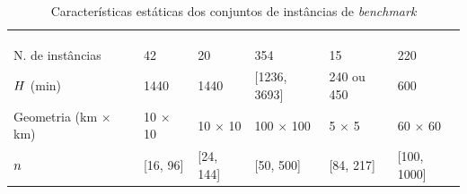 \begin{table}[]
\newcommand{\firstColumnWidth}{1.52cm}
\newcommand{\columnWidth}{2.25cm}
\newcommand{\numberOfRows}{2}
\footnotesize
\caption{Características estáticas dos conjuntos de instâncias de 
         \textit{benchmark}}
\label{tab:instancias}
\begin{tabular}{llllll}
\toprule
\multirow{4}{\columnWidth}{} & 
  \multirow{\numberOfRows}{\columnWidth}{\textcite{ropke_models_2007}} & 
  \multirow{\numberOfRows}{\columnWidth}{\textcite{cordeau_tabu_2003}} & 
  \multirow{\numberOfRows}{\columnWidth}{\textcite{li_metaheuristic_2003}} & 
  \multirow{\numberOfRows}{\columnWidth}{
    \textcite{gendreau_neighborhood_2006}} & 
  \multirow{\numberOfRows}{\columnWidth}{
    \textcite{mitrovic-minic_waiting_2004}}
\\ & & & & & \\ & & & & & \\ & & & & & \\   
\midrule
\multirow{\numberOfRows}{\firstColumnWidth}{N. de instâncias} & 
  \multirow{\numberOfRows}{\columnWidth}{42} & 
  \multirow{\numberOfRows}{\columnWidth}{20} & 
  \multirow{\numberOfRows}{\columnWidth}{354} & 
  \multirow{\numberOfRows}{\columnWidth}{15} & 
  \multirow{\numberOfRows}{\columnWidth}{220}
\\ & & & & & \\
\multirow{\numberOfRows}{\firstColumnWidth}{$H$ (min)} & 
  \multirow{\numberOfRows}{\columnWidth}{1440} & 
  \multirow{\numberOfRows}{\columnWidth}{1440} & 
  \multirow{\numberOfRows}{\columnWidth}{[1236, 3693]} & 
  \multirow{\numberOfRows}{\columnWidth}{240 ou 450} & 
  \multirow{\numberOfRows}{\columnWidth}{600}
\\ & & & & & \\
\multirow{\numberOfRows}{\firstColumnWidth}{Geometria (km $\times$ km)} & 
  \multirow{\numberOfRows}{\columnWidth}{10 $\times$ 10} & 
  \multirow{\numberOfRows}{\columnWidth}{10 $\times$ 10} & 
  \multirow{\numberOfRows}{\columnWidth}{100 $\times$ 100} & 
  \multirow{\numberOfRows}{\columnWidth}{5 $\times$ 5} & 
  \multirow{\numberOfRows}{\columnWidth}{60 $\times$ 60}
\\ & & & & & \\
\multirow{\numberOfRows}{\firstColumnWidth}{$n$} & 
  \multirow{\numberOfRows}{\columnWidth}{[16, 96]} & 
  \multirow{\numberOfRows}{\columnWidth}{[24, 144]} & 
  \multirow{\numberOfRows}{\columnWidth}{[50, 500]} & 
  \multirow{\numberOfRows}{\columnWidth}{[84, 217]} & 
  \multirow{\numberOfRows}{\columnWidth}{[100, 1000]}

\end{tabular}
\end{table}

